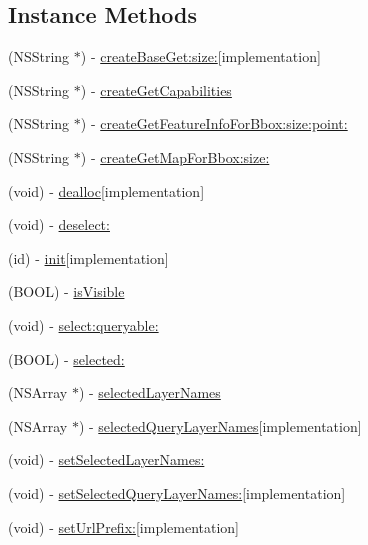 \subsection*{Instance Methods}
\begin{DoxyCompactItemize}
\item 
(N\-S\-String $\ast$) -\/ \hyperlink{interface_r_m_w_m_s_a0a9c3e01b58faa3a360fbcd65d7e4073}{create\-Base\-Get\-:size\-:}{\ttfamily  \mbox{[}implementation\mbox{]}}
\item 
(N\-S\-String $\ast$) -\/ \hyperlink{interface_r_m_w_m_s_aef7afe806feff59f25ff6a4737e4717f}{create\-Get\-Capabilities}
\item 
(N\-S\-String $\ast$) -\/ \hyperlink{interface_r_m_w_m_s_ade22277b8204be87c7a67b173e67f0b6}{create\-Get\-Feature\-Info\-For\-Bbox\-:size\-:point\-:}
\item 
(N\-S\-String $\ast$) -\/ \hyperlink{interface_r_m_w_m_s_aa6f693215400970f56c6e29f068956d9}{create\-Get\-Map\-For\-Bbox\-:size\-:}
\item 
(void) -\/ \hyperlink{interface_r_m_w_m_s_a000cf68dac73936782d590660c427475}{dealloc}{\ttfamily  \mbox{[}implementation\mbox{]}}
\item 
(void) -\/ \hyperlink{interface_r_m_w_m_s_adcdb60d7ce2b6a02881e0a0eb562048e}{deselect\-:}
\item 
(id) -\/ \hyperlink{interface_r_m_w_m_s_a3f5050d47c91bf587db70a7626dc8d42}{init}{\ttfamily  \mbox{[}implementation\mbox{]}}
\item 
(B\-O\-O\-L) -\/ \hyperlink{interface_r_m_w_m_s_a1a268006b5f8a9597b40e6b33bc50c10}{is\-Visible}
\item 
(void) -\/ \hyperlink{interface_r_m_w_m_s_a3c02b755dcbeda9c99490f68d210ca56}{select\-:queryable\-:}
\item 
(B\-O\-O\-L) -\/ \hyperlink{interface_r_m_w_m_s_af81c841995ba27e72ed7c19fc350141f}{selected\-:}
\item 
(N\-S\-Array $\ast$) -\/ \hyperlink{interface_r_m_w_m_s_a8e0cb811c178df258907841ceec3775d}{selected\-Layer\-Names}
\item 
(N\-S\-Array $\ast$) -\/ \hyperlink{interface_r_m_w_m_s_a100e29d678433e6ddfda644e8a09054a}{selected\-Query\-Layer\-Names}{\ttfamily  \mbox{[}implementation\mbox{]}}
\item 
(void) -\/ \hyperlink{interface_r_m_w_m_s_ae76696ebe1fd6a8fe449186510d9cee3}{set\-Selected\-Layer\-Names\-:}
\item 
(void) -\/ \hyperlink{interface_r_m_w_m_s_af0fb072047aa8c2e96d9b7f2bdb6efe2}{set\-Selected\-Query\-Layer\-Names\-:}{\ttfamily  \mbox{[}implementation\mbox{]}}
\item 
(void) -\/ \hyperlink{interface_r_m_w_m_s_a604f85760139733db207a5c831a2051f}{set\-Url\-Prefix\-:}{\ttfamily  \mbox{[}implementation\mbox{]}}
\end{DoxyCompactItemize}
